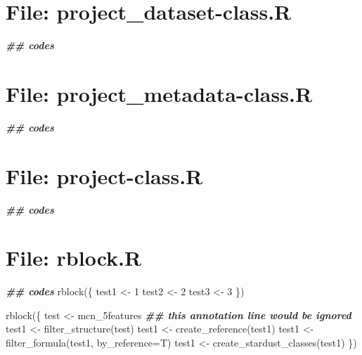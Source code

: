 \documentclass[
]{article}
\newenvironment{Shaded}{\begin{snugshade}}{\end{snugshade}}
\newcommand{\AttributeTok}[1]{\textcolor[rgb]{0.77,0.63,0.00}{#1}}
\newcommand{\DecValTok}[1]{\textcolor[rgb]{0.00,0.00,0.81}{#1}}
\newcommand{\DocumentationTok}[1]{\textcolor[rgb]{0.56,0.35,0.01}{\textbf{\textit{#1}}}}
\newcommand{\FunctionTok}[1]{\textcolor[rgb]{0.00,0.00,0.00}{#1}}
\newcommand{\NormalTok}[1]{#1}
\newcommand{\OtherTok}[1]{\textcolor[rgb]{0.56,0.35,0.01}{#1}}
\begin{document}
\hypertarget{file-project_dataset-class.r}{%
\section{File: project\_dataset-class.R}\label{file-project_dataset-class.r}}

\begin{Shaded}
\begin{Highlighting}[]
\DocumentationTok{\#\# codes}
\end{Highlighting}
\end{Shaded}

\hypertarget{file-project_metadata-class.r}{%
\section{File: project\_metadata-class.R}\label{file-project_metadata-class.r}}

\begin{Shaded}
\begin{Highlighting}[]
\DocumentationTok{\#\# codes}
\end{Highlighting}
\end{Shaded}

\hypertarget{file-project-class.r}{%
\section{File: project-class.R}\label{file-project-class.r}}

\begin{Shaded}
\begin{Highlighting}[]
\DocumentationTok{\#\# codes}
\end{Highlighting}
\end{Shaded}

\hypertarget{file-rblock.r}{%
\section{File: rblock.R}\label{file-rblock.r}}

\begin{Shaded}
\begin{Highlighting}[]
\DocumentationTok{\#\# codes}
\FunctionTok{rblock}\NormalTok{(\{}
\NormalTok{  test1 }\OtherTok{\textless{}{-}} \DecValTok{1}
\NormalTok{  test2 }\OtherTok{\textless{}{-}} \DecValTok{2}
\NormalTok{  test3 }\OtherTok{\textless{}{-}} \DecValTok{3}
\NormalTok{\})}

\FunctionTok{rblock}\NormalTok{(\{}
\NormalTok{  test }\OtherTok{\textless{}{-}}\NormalTok{ mcn\_5features}
  \DocumentationTok{\#\# this annotation line would be ignored}
\NormalTok{  test1 }\OtherTok{\textless{}{-}} \FunctionTok{filter\_structure}\NormalTok{(test)}
\NormalTok{  test1 }\OtherTok{\textless{}{-}} \FunctionTok{create\_reference}\NormalTok{(test1)}
\NormalTok{  test1 }\OtherTok{\textless{}{-}} \FunctionTok{filter\_formula}\NormalTok{(test1, }\AttributeTok{by\_reference=}\NormalTok{T)}
\NormalTok{  test1 }\OtherTok{\textless{}{-}} \FunctionTok{create\_stardust\_classes}\NormalTok{(test1)}
\NormalTok{\})}
\end{Highlighting}
\end{Shaded}
\end{document}
